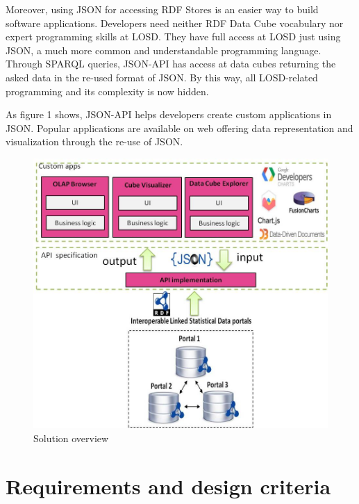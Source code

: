 \documentclass{llncs}
\begin{document}
Moreover, using JSON for accessing RDF Stores is an easier way to build software applications. Developers need neither RDF Data Cube vocabulary nor expert programming skills at LOSD. They have full access at LOSD just using JSON, a much more common and understandable programming language. Through SPARQL queries, JSON-API has access at data cubes returning the asked data in the re-used format of JSON. By this way, all LOSD-related programming and its complexity is now hidden.

As figure 1 shows, JSON-API helps developers create custom applications in JSON. Popular   applications are available on web offering data representation and visualization through the re-use of JSON.  



\begin{figure}
  \includegraphics{images/overview.jpg}
\caption{Solution overview}
\label{fig:overview}
\end{figure}


\section{Requirements and design criteria}\label{sec:reqs}
\end{document}

